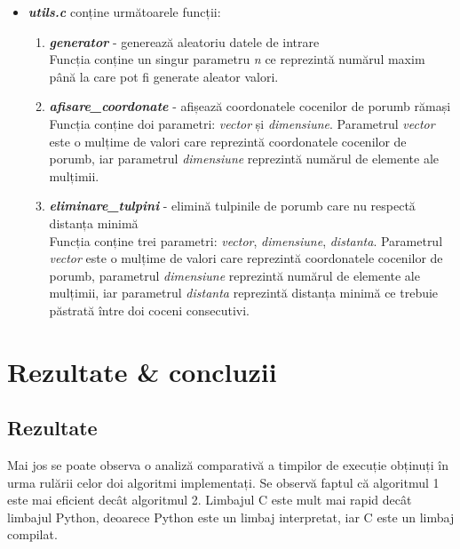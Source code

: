 \documentclass[11pt,a4paper]{article}
\begin{document}
\begin{itemize}
    \item \textbf{\textit{utils.c}} conține următoarele funcții: 
    \begin{enumerate}
        \item \textbf{\textit{generator}} - generează aleatoriu datele de intrare  \\
        Funcția conține un singur parametru \emph{n} ce reprezintă numărul maxim până la care pot fi generate aleator valori.
        \item \textbf{\textit{afisare\_coordonate}} - afișează coordonatele cocenilor de porumb rămași \\
        Funcția conține doi parametri: \emph{vector} și \emph{dimensiune}. Parametrul \emph{vector} este o mulțime de valori care reprezintă coordonatele cocenilor de porumb, iar parametrul \emph{dimensiune} reprezintă numărul de elemente ale mulțimii.
        \item \textbf{\textit{eliminare\_tulpini}} - elimină tulpinile de porumb care nu respectă distanța minimă \\
        Funcția conține trei parametri: \emph{vector}, \emph{dimensiune}, \emph{distanta}. Parametrul \emph{vector} este o mulțime de valori care reprezintă coordonatele cocenilor de porumb, parametrul \emph{dimensiune} reprezintă numărul de elemente ale mulțimii, iar parametrul \emph{distanta} reprezintă distanța minimă ce trebuie păstrată între doi coceni consecutivi.
    \end{enumerate}
    
\end{itemize}    

\section{Rezultate \& concluzii}
    \subsection{Rezultate}
    Mai jos se poate observa o analiză comparativă a timpilor de execuție obținuți în urma rulării celor doi algoritmi implementați. Se observă faptul că algoritmul 1 este mai eficient decât algoritmul 2. Limbajul C este mult mai rapid decât limbajul Python, deoarece Python este un limbaj interpretat, iar C este un limbaj compilat. \\
\end{document}
